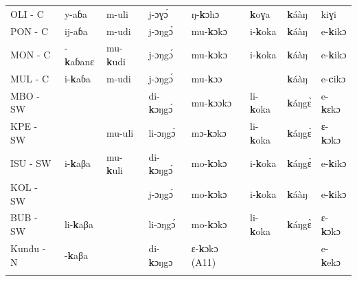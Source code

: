 \documentclass[output=paper,colorlinks,citecolor=brown
]{langscibook}
\begin{document}
\begin{table}[p]
{\begin{tabular}{llllllll}
OLI - C                   & y-aɓa                    & m-uli                   & j-ɔɣɔ́                  & ŋ-\textbf{k}ɔhɔ                       & \textbf{k}oɣa                              & \textbf{k}áàŋ                     & kiɣi                     \\
PON - C                   & ij-aɓa                   & m-udi                   & j-ɔŋgɔ́                 & mu-\textbf{k}ɔkɔ                      & i-\textbf{k}oka                            & \textbf{k}áàŋ                     & e-\textbf{k}ikɔ                   \\
MON - C                   & -\textbf{k}aɓanɛ                  & mu-\textbf{k}udi                 & j-ɔŋgɔ́                 & mu-\textbf{k}ɔkɔ                      & i-\textbf{k}oka                            & \textbf{k}áàŋ                     & e-\textbf{k}ikɔ                   \\
MUL - C                   & i-\textbf{k}aɓa                   & m-udi                   & j-ɔŋgɔ́                 & mu-\textbf{k}ɔɔ                       &                                   & \textbf{k}áàŋ                     & e-\textbf{c}ikɔ                   \\
MBO - SW                  &                          &                         & di-\textbf{k}ɔŋgɔ́               & mu-\textbf{k}ɔɔkɔ                     & li-\textbf{k}oka                           & \textbf{k}áŋgɛ̀                    & e-\textbf{k}ɛkɔ                   \\
KPE - SW                  &                          & mu-uli                  & li-ɔŋgɔ́                & mɔ-\textbf{k}ɔkɔ                      & li-\textbf{k}oka                           & \textbf{k}áŋgɛ̀                    & ɛ-\textbf{k}ɔkɔ                   \\
ISU - SW                  & i-\textbf{k}aβa                   & mu-\textbf{k}uli                 & di-\textbf{k}ɔŋgɔ́               & mo-\textbf{k}ɔkɔ                      & i-\textbf{k}oka                            & \textbf{k}áŋgɛ̀                    & e-\textbf{k}ikɔ                   \\
KOL - SW                  &                          &                         & j-ɔŋgɔ́                 & mo-\textbf{k}ɔkɔ                      & i-\textbf{k}oka                            & \textbf{k}áàŋ                     & e-\textbf{k}ikɔ                   \\
BUB - SW                  & li-\textbf{k}aβa                  &                         & li-ɔŋgɔ́                & mo-\textbf{k}ɔkɔ                      & li-\textbf{k}oka                           & \textbf{k}áŋgɛ̀                    & ɛ-\textbf{k}ɔkɔ                   \\
Kundu - N                 & -\textbf{k}aβa                    &                         & di-\textbf{k}ɔŋgɔ                & ɛ-\textbf{k}ɔkɔ (A11)                 &                                   &                            & e-\textbf{k}ekɔ         \\ 
   \lspbottomrule
 \end{tabular}
 }
\end{table}
\end{document}
